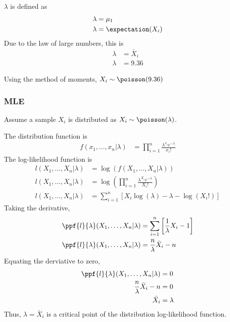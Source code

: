 \documentclass[11pt]{article}
\begin{document}
$\lambda$ is defined as
\begin{align*}
    \lambda &= \mu_1 \\
    \lambda &= \expectation (X_i) \\
\end{align*}
Due to the law of large numbers, this is
\begin{align*}
    \lambda &= \bar{X}_i \\
    \lambda &= 9.36
\end{align*}
\begin{mdframed}
    Using the method of moments, $X_i \sim \poisson(9.36)$
\end{mdframed}

\subsubsection{MLE}
Assume a sample $X_i$ is distributed as $X_i\sim\poisson(\lambda)$.

The distribution function is
\begin{align*}
    f(x_1, \dots, x_n | \lambda) &= \prod_{i=1}^{n} \frac{\lambda^{x_i} e^{-\lambda}}{x_{i}!}
\end{align*}
The log-likelihood function is
\begin{align*}
    l(X_1, \dots, X_n | \lambda) &= \log\left(f(X_1, \dots, X_n | \lambda)\right) \\
    l(X_1, \dots, X_n | \lambda) &= \log\left(\prod_{i=1}^{n} \frac{\lambda^{X_i} e^{-\lambda}}{X_i!}\right) \\
    l(X_1, \dots, X_n | \lambda) &= \sum_{i=1}^{n} \left[ X_i \log(\lambda) - \lambda - \log(X_i!)\right]
\end{align*}
Taking the derivative,
\begin{align*}
    \ppf{l}{\lambda}(X_1, \dots, X_n | \lambda) &= \sum_{i=1}^{n} \left[ \frac{1}{\lambda} X_i - 1 \right] \\
    \ppf{l}{\lambda}(X_1, \dots, X_n | \lambda) &= \frac{n}{\lambda} \bar{X}_i - n
\end{align*}
Equating the derviative to zero,
\begin{align*}
    \ppf{l}{\lambda}(X_1, \dots, X_n | \lambda) &= 0 \\
    \frac{n}{\lambda} \bar{X}_i - n &= 0 \\
    \bar{X}_i &= \lambda
\end{align*}
Thus, $\lambda = \bar{X}_i$ is a critical point of the distribution log-likelihood function.
\end{document}
